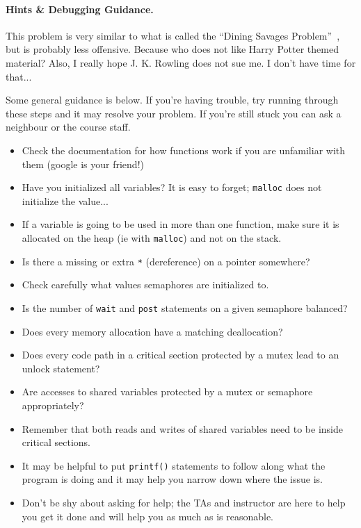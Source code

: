 \paragraph{Hints \& Debugging Guidance.}
This problem is very similar to what is called the ``Dining Savages Problem''~\cite{lbs}, but is probably less offensive. Because who does not like Harry Potter themed material? Also, I really hope J. K. Rowling does not sue me. I don't have time for that...

Some general guidance is below. If you're having trouble, try running through these steps and it may resolve your problem. If you're still stuck you can ask a neighbour or the course staff.
\begin{itemize}
	\item Check the documentation for how functions work if you are unfamiliar with them (google is your friend!)
	\item Have you initialized all variables? It is easy to forget; \texttt{malloc} does not initialize the value...
	\item If a variable is going to be used in more than one function, make sure it is allocated on the heap (ie with \texttt{malloc}) and not on the stack.
	\item Is there a missing or extra \texttt{*} (dereference) on a pointer somewhere?
	\item Check carefully what values semaphores are initialized to.
	\item Is the number of \texttt{wait} and \texttt{post} statements on a given semaphore balanced? 
	\item Does every memory allocation have a matching deallocation?
	\item Does every code path in a critical section protected by a mutex lead to an unlock statement? 
	\item Are accesses to shared variables protected by a mutex or semaphore appropriately?
	\item Remember that both reads and writes of shared variables need to be inside critical sections.
	\item It may be helpful to put \texttt{printf()} statements to follow along what the program is doing and it may help you narrow down where the issue is.
	\item Don't be shy about asking for help; the TAs and instructor are here to help you get it done and will help you as much as is reasonable.
\end{itemize}



